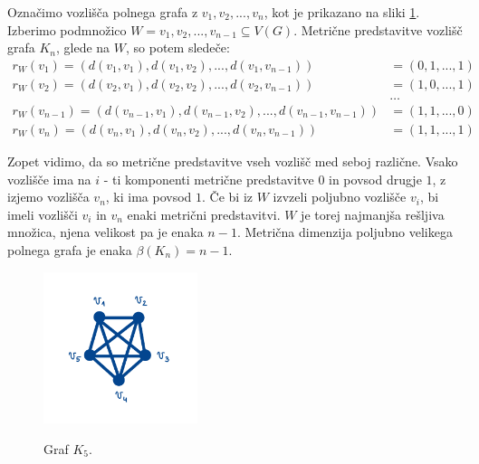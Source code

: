 \documentclass[mat1, tisk]{fmfdelo}
\begin{document}
\begin{primer}\label{pr:dim_poln}
    Označimo vozlišča polnega grafa z $v_1, v_2, ..., v_n$, kot je prikazano na sliki \ref{fig:polni}. 
    Izberimo podmnožico $W = {v_1, v_2, ... , v_{n-1}} \subseteq V(G).$ 
    Metrične predstavitve vozlišč grafa $K_n$, glede na $W$, so potem sledeče:
    \begin{align*}
        r_W(v_1) = (d(v_1, v_1), d(v_1, v_2), ... , d(v_1, v_{n-1})) & = (0, 1, ... , 1) \\
        r_W(v_2) = (d(v_2, v_1), d(v_2, v_2), ... , d(v_2, v_{n-1})) & = (1, 0, ... , 1) \\
        & \dots \\
        r_W(v_{n-1}) = (d(v_{n-1}, v_1), d(v_{n-1}, v_2), ... , d(v_{n-1}, v_{n-1})) & = (1, 1, ... , 0) \\
        r_W(v_n) = (d(v_n, v_1), d(v_n, v_2), ... ,  d(v_n, v_{n-1})) & = (1, 1, ... , 1)
    \end{align*}
    
    Zopet vidimo, da so metrične predstavitve vseh vozlišč med seboj različne. Vsako 
    vozlišče ima na $i$ - ti komponenti metrične predstavitve $0$ in povsod drugje $1$, 
    z izjemo vozlišča $v_n$, ki ima povsod $1$. Če bi iz $W$ izvzeli poljubno vozlišče $v_i$, 
    bi imeli vozlišči $v_i$ in $v_n$ enaki metrični predstavitvi. $W$  je torej najmanjša rešljiva množica, 
    njena velikost pa je enaka $n-1$. Metrična dimenzija poljubno velikega polnega grafa je enaka 
    $\beta(K_n) = n-1.$

    \begin{figure}[h]
        \caption{Graf $K_5$.}
        \centering
        \includegraphics[width=0.4\textwidth]{IMG_polni.jpg}
        \label{fig:polni}
    \end{figure}

\end{primer}


\end{document}
